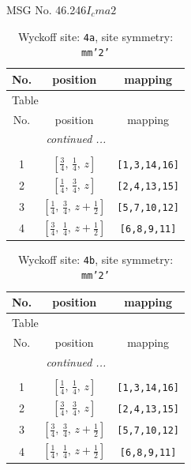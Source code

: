 \documentclass[fleqn,8pt]{jsarticle}
\begin{document}
\setcounter{MaxMatrixCols}{32}

\renewcommand{\tablename}{Table~}
\renewcommand{\figurename}{Figure~}
\begin{center}
\LARGE
MSG No. 46.246\quad$I_{c}ma2$
\end{center}
\renewcommand{\arraystretch}{1.2}
\begin{longtable}{ccc}
\caption{Wyckoff site: {\tt 4a}, site symmetry: {\tt mm'2'}}
 \\
 \hline \hline
No. & position & mapping \\ \hline \endfirsthead

\multicolumn{2}{l}{\tablename\ \thetable{}} \\
 \hline \hline
No. & position & mapping \\ \hline \endhead

 \hline \hline
\multicolumn{2}{r}{\footnotesize\it continued ...} \\ \endfoot

 \hline \hline
\multicolumn{2}{r}{} \\ \endlastfoot

1 & $\left[ \frac{3}{4},\, \frac{1}{4},\, z \right]$ & {\tt [1,3,14,16]} \\ \hline
2 & $\left[ \frac{1}{4},\, \frac{3}{4},\, z \right]$ & {\tt [2,4,13,15]} \\ \hline
3 & $\left[ \frac{1}{4},\, \frac{3}{4},\, z + \frac{1}{2} \right]$ & {\tt [5,7,10,12]} \\ \hline
4 & $\left[ \frac{3}{4},\, \frac{1}{4},\, z + \frac{1}{2} \right]$ & {\tt [6,8,9,11]} \\
\end{longtable}
\renewcommand{\arraystretch}{1.2}
\begin{longtable}{ccc}
\caption{Wyckoff site: {\tt 4b}, site symmetry: {\tt mm'2'}}
 \\
 \hline \hline
No. & position & mapping \\ \hline \endfirsthead

\multicolumn{2}{l}{\tablename\ \thetable{}} \\
 \hline \hline
No. & position & mapping \\ \hline \endhead

 \hline \hline
\multicolumn{2}{r}{\footnotesize\it continued ...} \\ \endfoot

 \hline \hline
\multicolumn{2}{r}{} \\ \endlastfoot

1 & $\left[ \frac{1}{4},\, \frac{1}{4},\, z \right]$ & {\tt [1,3,14,16]} \\ \hline
2 & $\left[ \frac{3}{4},\, \frac{3}{4},\, z \right]$ & {\tt [2,4,13,15]} \\ \hline
3 & $\left[ \frac{3}{4},\, \frac{3}{4},\, z + \frac{1}{2} \right]$ & {\tt [5,7,10,12]} \\ \hline
4 & $\left[ \frac{1}{4},\, \frac{1}{4},\, z + \frac{1}{2} \right]$ & {\tt [6,8,9,11]} \\
\end{longtable}
\end{document}
